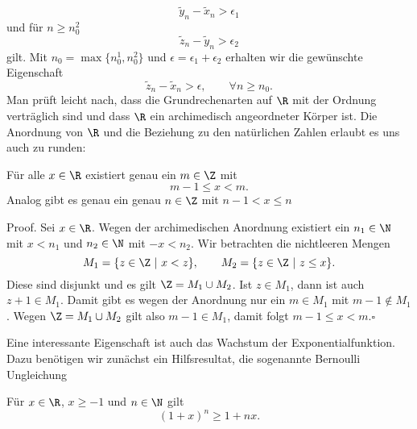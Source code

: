 \documentclass[letterpaper,10pt,english]{jupyterBook}
\begin{document}
\begin{equation*}
\tilde y_n - \tilde x_n > \epsilon_1
\end{equation*}
und für \(n\geq n_0^2\)
\begin{equation*}
\tilde z_n - \tilde y_n > \epsilon_2
\end{equation*}
gilt. Mit \(n_0=\max\{n_0^1,n_0^2\}\) und \(\epsilon = \epsilon_1 + \epsilon_2\) erhalten wir die gewünschte Eigenschaft
\begin{equation*}
\tilde z_n - \tilde x_n > \epsilon, \qquad \forall n \geq n_0.
\end{equation*}
Man prüft leicht nach, dass die Grundrechenarten auf \(\R\) mit der Ordnung verträglich sind und dass \(\R\) ein archimedisch angeordneter Körper ist. Die Anordnung von \(\R\) und die Beziehung zu den natürlichen Zahlen erlaubt es uns auch zu runden:
\label{grundlagen/zahlensysteme:lemma-19}
\begin{lemma}{}{}



Für alle \(x \in \R\) existiert genau ein \(m\in \Z\) mit
\begin{equation*}
 m-1 \leq x < m .
\end{equation*}
Analog gibt es genau ein genau \(n \in \Z\) mit \(n-1 < x \leq n\)
\end{lemma}

\begin{emphBox}{}{}
Proof. Sei \(x \in \R\). Wegen der archimedischen Anordnung existiert ein \(n_1 \in \N\) mit \(x < n_1\) und \(n_2 \in \N\) mit \(-x < n_2\). Wir betrachten die nichtleeren Mengen
\begin{equation*}
M_1 = \{ z \in \Z~|~ x < z\}, \qquad M_2 = \{ z \in \Z~|~ z \leq x\}.
\end{equation*}
Diese sind disjunkt und es gilt \(\Z = M_1 \cup M_2\). Ist \(z \in M_1\), dann ist auch \(z+1 \in M_1\). Damit gibt es wegen der Anordnung nur ein \(m \in M_1\) mit \(m-1 \notin M_1\). Wegen \(\Z = M_1 \cup M_2\) gilt also \(m-1 \in M_1\), damit folgt \(  m-1 \leq x < m . \square\)
\end{emphBox}

Eine interessante Eigenschaft ist auch das Wachstum der Exponentialfunktion. Dazu benötigen wir zunächst ein Hilfsresultat, die sogenannte Bernoulli Ungleichung
\label{grundlagen/zahlensysteme:lemma-20}
\begin{lemma}{}{}



Für \(x \in \R\), \(x \geq -1\) und \(n\in \N\) gilt
\begin{equation*}
 (1+x)^n \geq 1 + n x.
\end{equation*}\end{lemma}
\end{document}
